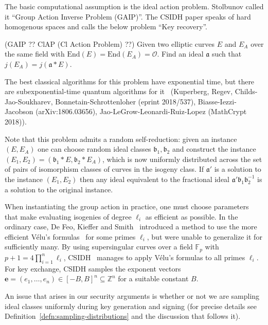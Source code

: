 \documentclass{llncs}
\newcommand{\F}{\mathbb{F}}
\newcommand{\OO}{\mathcal{O}}
\newcommand{\Z}{\mathbb{Z}}
\newcommand{\End}{\text{End}}
\newcommand{\Cl}{\text{Cl}}
\renewcommand{\a}{\mathfrak{a}}
\renewcommand{\b}{\mathfrak{b}}
\newcommand{\e}{\textbf{e}}
\begin{document}
The basic computational assumption is the ideal action problem.
Stolbunov called it ``Group Action Inverse Problem (GAIP)''.
The CSIDH paper speaks of hard homogenous spaces and calls the below problem ``Key recovery''.

\begin{definition}\label{defn:ass1} (GAIP ?? ClAP (Cl Action Problem) ??)
Given two elliptic curves $E$ and $E_A$ over the same field with $\End(E) = \End(E_A) = \OO$. Find an ideal $\a$ such that $j( E_A ) = j( \a * E )$.
\end{definition}

The best classical algorithms for this problem have exponential time, but there are subexponential-time quantum algorithms for it~\cite{Kup,regev04,childs2014constructing,Kuperberg2013} (Kuperberg, Regev, Childs-Jao-Soukharev, Bonnetain-Schrottenloher (eprint 2018/537), Biasse-Iezzi-Jacobson (arXiv:1806.03656), Jao-LeGrow-Leonardi-Ruiz-Lopez (MathCrypt 2018)).

Note that this problem admits a random self-reduction: given an instance $(E, E_A)$ one can choose random ideal classes $\b_1, \b_2$ and construct the instance $(E_1, E_2) = (\b_1 * E, \b_2 * E_A )$, which is now uniformly distributed across the set of pairs of isomorphism classes of curves in the isogeny class.
If $\a'$ is a solution to the instance $(E_1, E_2)$ then any ideal equivalent to the fractional ideal $\a'\b_1 \b_2^{-1}$ is a solution to the original instance.

When instantiating the group action in practice, one must choose parameters that make evaluating isogenies of degree $\ell_i$ as efficient as possible.
In the ordinary case, De Feo, Kieffer and Smith~\cite{DFKS18} introduced a method to use the more efficient V\'elu's formulas~\cite{velu71} for some primes $\ell_i$, but were unable to generalize it for sufficiently many.
By using supersingular curves over a field $\F_p$ with $p+1 = 4\prod_{i=1}^n\ell_i$, CSIDH~\cite{CLMPR18} manages to apply V\'elu's formulas to all primes $\ell_i$.
For key exchange, CSIDH samples the exponent vectors $\e = (e_1, \dots, e_n) \in [-B,B]^n \subseteq \Z^n$ for a suitable constant $B$.



An issue that arises in our security arguments is whether or not we are sampling ideal classes uniformly during key generation and signing (for precise details see Definition~\ref{defn:sampling-distributions} and the discussion that follows it).
\end{document}
